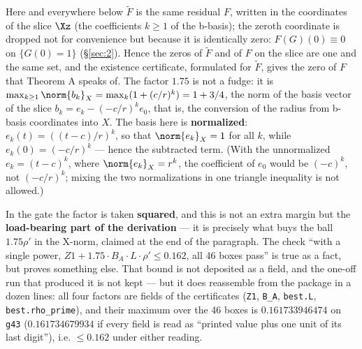 Here and everywhere below $\widetilde{F}$ is the
same residual $F$, written in the coordinates of the slice $\Xz$ (the coefficients
$k \ge 1$ of the b-basis); the zeroth coordinate is dropped not for convenience but
because it is identically zero: $F(G)(0) \equiv 0$ on $\{G(0) = 1\}$ (\S\ref{sec:2}). Hence the
zeros of $\widetilde{F}$ and of $F$ on the slice are one and the same set, and the existence
certificate, formulated for $\widetilde{F}$, gives the zero of $F$ that Theorem A speaks of.
The factor $1.75$ is not a fudge: it is $\max_{k \ge 1} \norm{b_k}_X = \max_k (1 + (c/r)^k) = 1 + 3/4$, the norm of the basis vector of the slice $b_k = e_k - (-c/r)^k e_0$,
that is, the conversion of the radius from b-basis coordinates into $X$. The
basis here is \textbf{normalized}: $e_k(t) = ((t-c)/r)^k$, so that $\norm{e_k}_X = 1$ for
all $k$, while $e_k(0) = (-c/r)^k$ --- hence the subtracted term. (With the
unnormalized $e_k = (t-c)^k$, where $\norm{e_k}_X = r^k$, the coefficient of $e_0$
would be $(-c)^k$, not $(-c/r)^k$; mixing the two normalizations in one triangle
inequality is not allowed.)

In the gate the factor is taken \textbf{squared}, and this is not an extra margin but
the \textbf{load-bearing part of the derivation} --- it is precisely what buys the ball
$1.75\rho'$ in the X-norm, claimed at the end of the paragraph. The check ``with a
single power, $Z1 + 1.75 \cdot B_A \cdot L \cdot \rho' \le 0.162$, all 46 boxes pass'' is true as a
fact, but proves something else. That bound is not deposited as a field, and the
one-off run that produced it is not kept --- but it does reassemble from the
package in a dozen lines: all four factors are fields of the certificates
(\texttt{Z1}, \texttt{B\_A}, \texttt{best.L}, \texttt{best.rho\_prime}), and their
maximum over the 46 boxes is $0.161733946474$ on \texttt{g43} ($0.161734679934$ if
every field is read as ``printed value plus one unit of its last digit''), i.e.
$\le 0.162$ under either reading.


